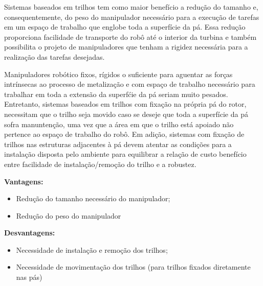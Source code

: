 Sistemas baseados em trilhos tem como maior benefício a redução do tamanho e,
consequentemente, do peso do manipulador necessário para a execução de tarefas
em um espaço de trabalho que englobe toda a superfície da pá.
Essa redução proporciona facilidade de transporte do robô até o interior da
turbina e também possibilita o projeto de manipuladores que tenham a rigidez
necessária para a realização das tarefas desejadas. 

Manipuladores robótico fixos, rígidos o suficiente para aguentar as forças intrínsecas ao
processo de metalização e com espaço de trabalho necessário para trabalhar em
toda a extensão da superfćie da pá seriam muito pesados.
Entretanto, sistemas baseados em trilhos com fixação na própria pá do rotor, necessitam que
o trilho seja movido caso se deseje que toda a superfície da pá sofra
manuntenção, uma vez que a área em que o trilho está apoiado não pertence ao espaço de
trabalho do robô. Em adição, sistemas com fixação de trilhos nas estruturas
adjacentes à pá devem atentar as condições para a instalação disposta pelo
ambiente para equilibrar a relação de custo benefício entre facilidade de
instalação/remoção do trilho e a robustez.

\textbf{Vantagens:}
\begin{itemize}
  \item Redução do tamanho necessário do manipulador;
  \item Redução do peso do manipulador
\end{itemize}

\textbf{Desvantagens:}
\begin{itemize}
  \item Necessidade de instalação e remoção dos trilhos;
  \item Necessidade de movimentação dos trilhos (para trilhos fixados
  diretamente nas pás)
\end{itemize}



